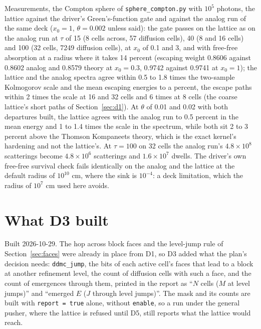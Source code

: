\documentclass[11pt]{article}
\newcommand{\key}[1]{\texttt{#1}}
\begin{document}
Measurements, the Compton sphere of \texttt{sphere\_compton.py} with $10^5$ photons, the
lattice against the driver's Green's-function gate and against the analog run of the
same deck ($x_0 = 1$, $\theta = 0.002$ unless said): the gate passes on the lattice as
on the analog run at $\tau$ of 15 (8 cells across, 57 diffusion cells), 40 (8 and 16
cells) and 100 (32 cells, 7249 diffusion cells), at $x_0$ of 0.1 and 3, and with
free-free absorption at a radius where it takes 14 percent (escaping weight 0.8606
against 0.8602 analog and 0.8579 theory at $x_0 = 0.3$, 0.9742 against 0.9741 at
$x_0 = 1$); the lattice and the analog spectra agree within 0.5 to 1.8 times the
two-sample Kolmogorov scale and the mean escaping energies to a percent, the escape
paths within 2 times the scale at 16 and 32 cells and 6 times at 8 cells (the coarse
lattice's short paths of Section~\ref{sec:d1}).  At $\theta$ of 0.01 and 0.02 with
both departures built, the lattice agrees with the analog run to 0.5 percent in the
mean energy and 1 to 1.4 times the scale in the spectrum, while both sit 2 to 3 percent
above the Thomson Kompaneets theory, which is the exact kernel's hardening and not the
lattice's.  At $\tau = 100$ on 32 cells the analog run's $4.8\times10^8$ scatterings
become $4.8\times10^6$ scatterings and $1.6\times10^7$ dwells.  The driver's own
free-free survival check fails identically on the analog and the lattice at the default
radius of $10^{10}$ cm, where the sink is $10^{-4}$: a deck limitation, which the radius
of $10^7$ cm used here avoids.

\section{What D3 built}
\label{sec:d3}

Built 2026-10-29.  The hop across block faces and the level-jump rule of
Section~\ref{sec:faces} were already in place from D1, so D3 added what the plan's
decision needs: \texttt{ddmc\_jump}, the bits of each active cell's faces that lead to a
block at another refinement level, the count of diffusion cells with such a face, and
the count of emergences through them, printed in the report as ``$N$ cells ($M$ at level
jumps)'' and ``emerged $E$ ($J$ through level jumps)''.  The mask and its counts are built
with \key{report = true} alone, without \key{enable}, so a run under the general pusher,
where the lattice is refused until D5, still reports what the lattice would reach.
\end{document}
